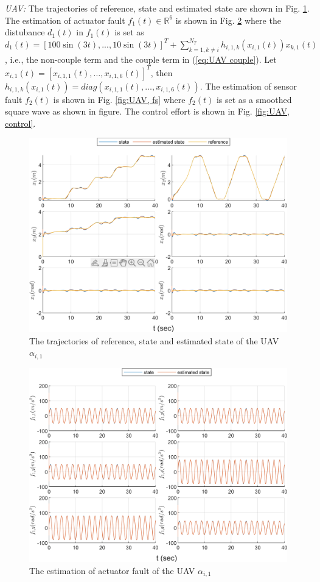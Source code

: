 \documentclass{ieeeaccess}
\begin{document}
\textit{UAV:}
The trajectories of reference, state and estimated state are shown in Fig. \ref{fig:UAV, state}. The estimation of actuator fault $f_1(t)\in\mathbb{R}^6$ is shown in Fig. \ref{fig:UAV, fa} where the distubance $d_1(t)$ in $f_1(t)$ is set as $d_1(t) = [100\sin(3t),...,10\sin(3t)]^T + \sum_{k = 1, k \neq i}^{N_T}h_{i, 1, k}(x_{i, 1}(t))x_{k, 1}(t)$, i.e., the non-couple term and the couple term in (\ref{eq:UAV couple}). Let $x_{i, 1}(t) = [x_{i, 1, 1}(t)\mathbin{,}\dots\mathbin{,}x_{i, 1, 6}(t)]^T$, then $h_{i, 1, k}(x_{i, 1}(t)) = diag(x_{i, 1, 1}(t)\mathbin{,}\dots\mathbin{,}x_{i, 1, 6}(t))$. The estimation of sensor fault $f_2(t)$ is shown in Fig. \ref{fig:UAV, fs} where $f_2(t)$ is set as a smoothed square wave as shown in figure. The control effort is shown in Fig. \ref{fig:UAV, control}.
\begin{figure}[htbp]
    \centering
    \includegraphics[scale=.57]{fig/uav (1).png}\caption{The trajectories of reference, state and estimated state of the UAV $\alpha_{i,1}$}%
    \label{fig:UAV, state}
\end{figure}
\begin{figure}[htbp]
    \centering
    \includegraphics[scale=.57]{fig/uav (2).png}\caption{The estimation of actuator fault of the UAV $\alpha_{i,1}$}
    \label{fig:UAV, fa}
\end{figure}
\end{document}

